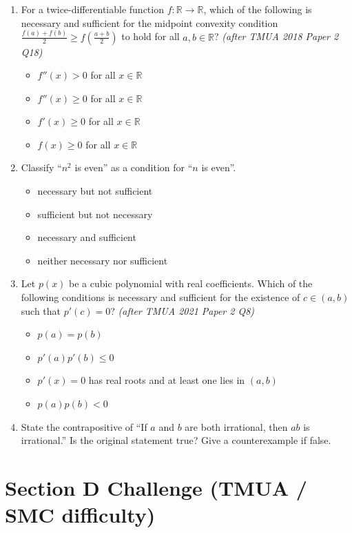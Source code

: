 \documentclass[11pt,a4paper]{article}
\begin{document}
\begin{enumerate}
\item For a twice-differentiable function $f:\mathbb{R}\to\mathbb{R}$, which of the following is necessary and sufficient for the midpoint convexity condition $\frac{f(a)+f(b)}{2} \ge f\left(\frac{a+b}{2}\right)$ to hold for all $a, b \in \mathbb{R}$? \textit{\small(after TMUA 2018 Paper 2 Q18)}
\begin{itemize}
\item[A)] $f''(x) > 0$ for all $x \in \mathbb{R}$
\item[B)] $f''(x) \ge 0$ for all $x \in \mathbb{R}$
\item[C)] $f'(x) \ge 0$ for all $x \in \mathbb{R}$
\item[D)] $f(x) \ge 0$ for all $x \in \mathbb{R}$
\end{itemize}

\item Classify ``$n^2$ is even'' as a condition for ``$n$ is even''.
\begin{itemize}
\item[A)] necessary but not sufficient
\item[B)] sufficient but not necessary
\item[C)] necessary and sufficient
\item[D)] neither necessary nor sufficient
\end{itemize}

\item Let $p(x)$ be a cubic polynomial with real coefficients. Which of the following conditions is necessary and sufficient for the existence of $c \in (a, b)$ such that $p'(c) = 0$? \textit{\small(after TMUA 2021 Paper 2 Q8)}
\begin{itemize}
\item[A)] $p(a) = p(b)$
\item[B)] $p'(a)p'(b) \le 0$
\item[C)] $p'(x) = 0$ has real roots and at least one lies in $(a, b)$
\item[D)] $p(a)p(b) < 0$
\end{itemize}

\item State the contrapositive of ``If $a$ and $b$ are both irrational, then $ab$ is irrational.'' Is the original statement true? Give a counterexample if false.

\end{enumerate}

\section*{Section D \quad Challenge \hfill{\normalfont\small(TMUA / SMC difficulty)}}
\end{document}
